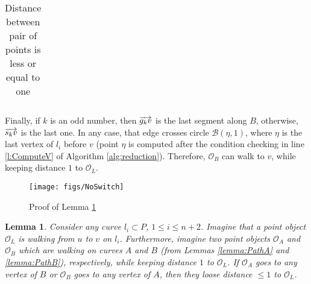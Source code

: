 \documentclass[12pt]{dalthesis}
\def\favoritefont{\bfseries \sffamily}
\def\QED{\ensuremath{{\Box}}}
\def\markatright#1{\leavevmode\unskip\nobreak\quad\hspace*{\fill}{#1}}
\newenvironment{proof}
	{\begin{trivlist}\item[\hskip\labelsep{\favoritefont Proof:}]}
	{\markatright{\QED}\end{trivlist}}
\newtheorem{lemma}[theorem]{Lemma}
\newcommand{\qed}{}
\newcommand{\CB}{{\mathscr B}}
\newcommand{\CO}{{\mathscr O}}
\newcommand{\cfev}{{l}}
\begin{document}
\begin{proof}
\begin{table}[h]
\begin{tabular}{ r | l | l  }
\end{tabular}
\caption{Distance between pair of points is less or equal to one}
\label{tab:PathB}
\end{table}



Finally, if $k$ is an odd number, then  
$\overrightarrow{g_kv}$ is the last segment along $B$, otherwise, 
$\overrightarrow{s_kv}$ is the last one. In any case, 
that edge crosses  circle $\CB(\eta,1)$, where $\eta$ is the last vertex of 
$\cfev_i$ before $v$ (point $\eta$ is computed after the condition checking 
in line \ref{l:ComputeV} of 
Algorithm \ref{alg:reduction}). Therefore, 
 $\CO_B$ can walk to $v$, while keeping distance $1$ to $\CO_L$. 


\qed





\end{proof}




\begin{figure}
	\centering
	\texttt{[image: figs/NoSwitch]}
	\caption{Proof of Lemma \ref{lemma:NoSwitchFromAtoB}}
	\label{fig:noswitch}
\end{figure}

	



\begin{lemma}\label{lemma:NoSwitchFromAtoB}
Consider any curve $\cfev_i \subset P $, $1\le i \le n+2$. Imagine that  
a point object $\CO_L$ is walking from $u$ to $v$ on $\cfev_i$. Furthermore, imagine
two point objects $\CO_A$ and $\CO_B$ which are walking on curves $A$ and $B$ 
(from Lemmas \ref{lemma:PathA} and \ref{lemma:PathB}), respectively,
while keeping distance $1$ to $\CO_L$. 
If $\CO_A$ goes to any vertex of $B$ or $\CO_B$ goes to any vertex of $A$, 
then they loose distance $\le 1$ to $\CO_L$.

\end{lemma}
\end{document}
